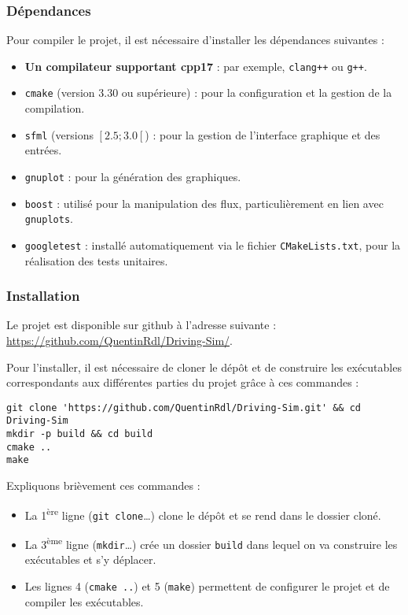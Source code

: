 \subsubsection{Dépendances}\label{subsubsec:dependances}
Pour compiler le projet, il est nécessaire d'installer les dépendances suivantes :
\begin{itemize}
    \item \textbf{Un compilateur supportant \gls{cpp}17} : par exemple, \texttt{clang++} ou \texttt{g++}.
    \item \texttt{\gls{cmake}} (version 3.30 ou supérieure) : pour la configuration et la gestion de la compilation.
    \item \texttt{\gls{sfml}} (versions $\left[2.5 ; 3.0\left[$) : pour la gestion de l'interface graphique et des entrées.
    \item \texttt{\gls{gnuplot}} : pour la génération des graphiques.
    \item \texttt{\gls{boost}} : utilisé pour la manipulation des flux, particulièrement en lien avec \texttt{\glspl{gnuplot}}.
    \item \texttt{\gls{googletest}} : installé automatiquement via le fichier \texttt{CMakeLists.txt}, pour la réalisation des tests unitaires.
\end{itemize}
\newpage
\subsubsection{Installation}\label{subsubsec:installation}
Le projet est disponible sur \gls{github} à l'adresse suivante : \url{https://github.com/QuentinRdl/Driving-Sim/}.

Pour l'installer, il est nécessaire de cloner le dépôt et de construire les exécutables correspondants aux différentes parties du projet grâce à ces commandes :

\begin{lstlisting}[style=bashStyle,label={lst:build}]
git clone 'https://github.com/QuentinRdl/Driving-Sim.git' && cd Driving-Sim
mkdir -p build && cd build
cmake ..
make
\end{lstlisting}
\noindent
Expliquons brièvement ces commandes :
\begin{itemize}
    \item La 1\textsuperscript{ère} ligne (\texttt{git clone}\dots) clone le dépôt et se rend dans le dossier cloné.
    \item La 3\textsuperscript{ème} ligne (\texttt{mkdir}\dots) crée un dossier \texttt{build} dans lequel on va construire les exécutables et s'y déplacer.
    \item Les lignes 4 (\texttt{cmake ..}) et 5 (\texttt{make}) permettent de configurer le projet et de compiler les exécutables.
\end{itemize}

